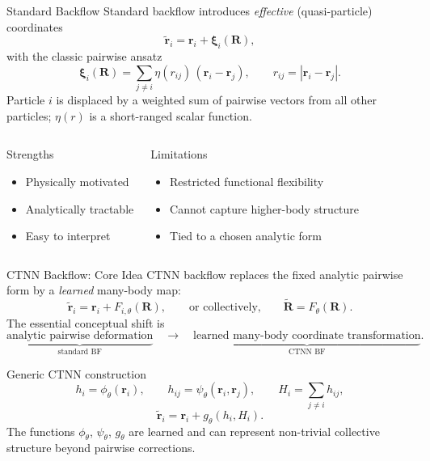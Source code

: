 \documentclass[aspectratio=169,10pt]{beamer}
\begin{document}
\begin{frame}{Standard Backflow}
Standard backflow introduces \emph{effective} (quasi-particle) coordinates
\[
  \tilde{\mathbf{r}}_i = \mathbf{r}_i + \bm{\xi}_i(\mathbf{R}),
\]
with the classic pairwise ansatz
\[
  \bm{\xi}_i(\mathbf{R})
  = \sum_{j\neq i}\eta(r_{ij})\,(\mathbf{r}_i-\mathbf{r}_j),
  \qquad r_{ij}=|\mathbf{r}_i-\mathbf{r}_j|.
\]
Particle $i$ is displaced by a weighted sum of pairwise vectors from
all other particles; $\eta(r)$ is a short-ranged scalar function.

\begin{columns}[T]
    \begin{block}{Strengths}
      \begin{itemize}
        \item Physically motivated
        \item Analytically tractable
        \item Easy to interpret
      \end{itemize}
    \end{block}
    \begin{alertblock}{Limitations}
      \begin{itemize}
        \item Restricted functional flexibility
        \item Cannot capture higher-body structure
        \item Tied to a chosen analytic form
      \end{itemize}
    \end{alertblock}
\end{columns}
\end{frame}


\begin{frame}{CTNN Backflow: Core Idea}
CTNN backflow replaces the fixed analytic pairwise form by a
\emph{learned} many-body map:
\[
  \tilde{\mathbf{r}}_i = \mathbf{r}_i + F_{i,\theta}(\mathbf{R}),
  \qquad\text{or collectively,}\qquad
  \tilde{\mathbf{R}} = F_\theta(\mathbf{R}).
\]
The essential conceptual shift is
\[
  \underbrace{\text{analytic pairwise deformation}}_{\text{standard BF}}
  \quad\longrightarrow\quad
  \underbrace{\text{learned many-body coordinate transformation}}_{\text{CTNN BF}}.
\]

\begin{block}{Generic CTNN construction}
  \[
    h_i = \phi_\theta(\mathbf{r}_i),\qquad
    h_{ij}=\psi_\theta(\mathbf{r}_i,\mathbf{r}_j),\qquad
    H_i = \textstyle\sum_{j\neq i}h_{ij},
  \]
  \[
    \tilde{\mathbf{r}}_i = \mathbf{r}_i + g_\theta(h_i,H_i).
  \]
  The functions $\phi_\theta$, $\psi_\theta$, $g_\theta$ are learned and
  can represent non-trivial collective structure beyond pairwise corrections.
\end{block}
\end{frame}
\end{document}
